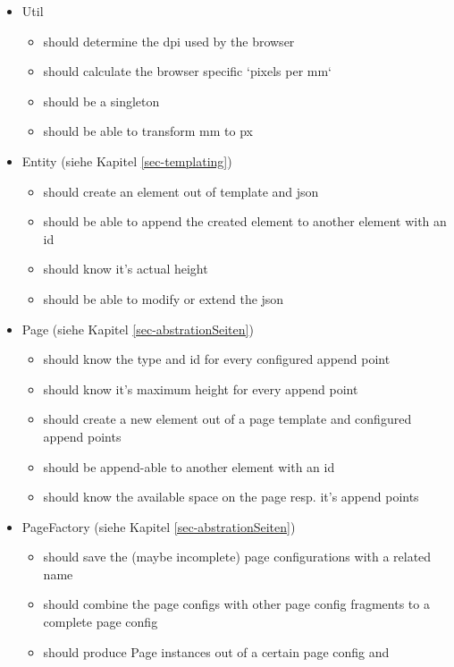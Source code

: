 \begin{itemize}
  \item Util
    \begin{itemize}
      \item should determine the dpi used by the browser
      \item should calculate the browser specific `pixels per mm`
      \item should be a singleton
      \item should be able to transform mm to px
    \end{itemize}
  \item Entity (siehe Kapitel \ref{sec-templating})
    \begin{itemize}
      \item should create an element out of template and json
      \item should be able to append the created element to another
            element with an id
      \item should know it's actual height
      \item should be able to modify or extend the json
    \end{itemize}
  \item Page (siehe Kapitel \ref{sec-abstrationSeiten})
    \begin{itemize}
      \item should know the type and id for every configured append point
      \item should know it's maximum height for every append point
      \item should create a new element out of a page template and
            configured append points
      \item should be append-able to another element with an id
      \item should know the available space on the page resp. it's
            append points
    \end{itemize}
  \item PageFactory (siehe Kapitel \ref{sec-abstrationSeiten})
    \begin{itemize}
      \item should save the (maybe incomplete) page configurations
            with a related name
      \item should combine the page configs with other page config fragments
            to a complete page config
      \item should produce Page instances out of a certain page config and

\end{itemize}
\end{itemize}
